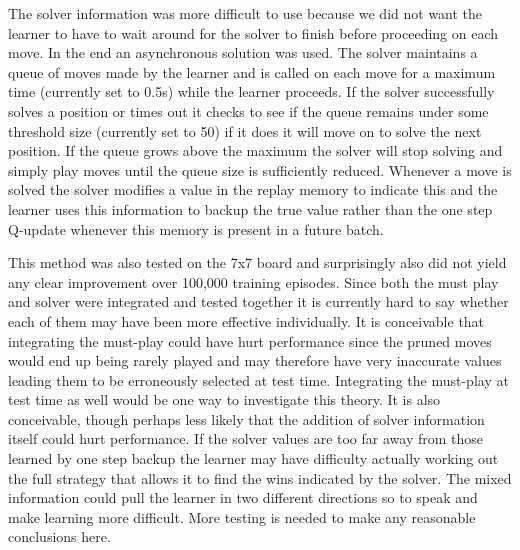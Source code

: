 \documentclass{article}
\begin{document}
The solver information was more difficult to use because we did not want the learner to have to wait around for the solver to finish before proceeding on each move. In the end an asynchronous solution was used. The solver maintains a queue of moves made by the learner and is called on each move for a maximum time (currently set to 0.5s) while the learner proceeds. If the solver successfully solves a position or times out it checks to see if the queue remains under some threshold size (currently set to 50) if it does it will move on to solve the next position. If the queue grows above the maximum the solver will stop solving and simply play moves until the queue size is sufficiently reduced. Whenever a move is solved the solver modifies a value in the replay memory to indicate this and the learner uses this information to backup the true value rather than the one step Q-update whenever this memory is present in a future batch. 

This method was also tested on the 7x7 board and surprisingly also did not yield any clear improvement over 100,000 training episodes. Since both the must play and solver were integrated and tested together it is currently hard to say whether each of them may have been more effective individually. It is conceivable that integrating the must-play could have hurt performance since the pruned moves would end up being rarely played and may therefore have very inaccurate values leading them to be erroneously selected at test time. Integrating the must-play at test time as well would be one way to investigate this theory. It is also conceivable, though perhaps less likely that the addition of solver information itself could hurt performance. If the solver values are too far away from those learned by one step backup the learner may have difficulty actually working out the full strategy that allows it to find the wins indicated by the solver. The mixed information could pull the learner in two different directions so to speak and make learning more difficult. More testing is needed to make any reasonable conclusions here.
\end{document}
